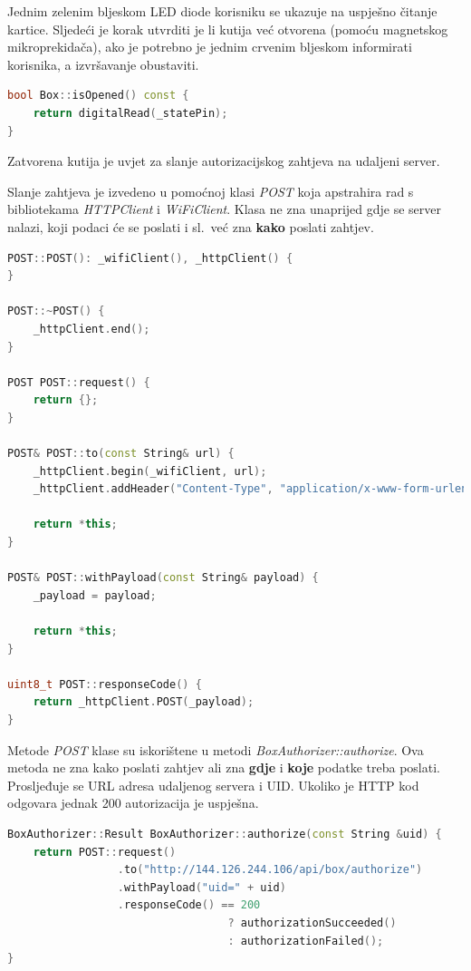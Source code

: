 Jednim zelenim bljeskom LED diode korisniku se ukazuje na uspješno čitanje kartice.
Sljedeći je korak utvrditi je li kutija već otvorena (pomoću magnetskog mikroprekidača), ako je potrebno je jednim
crvenim bljeskom informirati korisnika, a izvršavanje obustaviti.

\begin{lstlisting}[language=C++]
bool Box::isOpened() const {
    return digitalRead(_statePin);
}
\end{lstlisting}

Zatvorena kutija je uvjet za slanje autorizacijskog zahtjeva na udaljeni server.

Slanje zahtjeva je izvedeno u pomoćnoj klasi \textit{POST} koja apstrahira rad s bibliotekama \textit{HTTPClient} i
\textit{WiFiClient}.
Klasa ne zna unaprijed gdje se server nalazi, koji podaci će se poslati i sl.\ već zna \textbf{kako} poslati zahtjev.

\begin{lstlisting}[language=C++]
POST::POST(): _wifiClient(), _httpClient() {
}

POST::~POST() {
    _httpClient.end();
}

POST POST::request() {
    return {};
}

POST& POST::to(const String& url) {
    _httpClient.begin(_wifiClient, url);
    _httpClient.addHeader("Content-Type", "application/x-www-form-urlencoded");

    return *this;
}

POST& POST::withPayload(const String& payload) {
    _payload = payload;

    return *this;
}

uint8_t POST::responseCode() {
    return _httpClient.POST(_payload);
}
\end{lstlisting}

Metode \textit{POST} klase su iskorištene u metodi \textit{BoxAuthorizer::authorize}.
Ova metoda ne zna kako poslati zahtjev ali zna \textbf{gdje} i \textbf{koje} podatke treba poslati.
Prosljeđuje se URL adresa udaljenog servera i UID\@.
Ukoliko je HTTP kod odgovara jednak 200 autorizacija je uspješna.

\begin{lstlisting}[language=C++]
BoxAuthorizer::Result BoxAuthorizer::authorize(const String &uid) {
    return POST::request()
                 .to("http://144.126.244.106/api/box/authorize")
                 .withPayload("uid=" + uid)
                 .responseCode() == 200
                                  ? authorizationSucceeded()
                                  : authorizationFailed();
}
\end{lstlisting}
